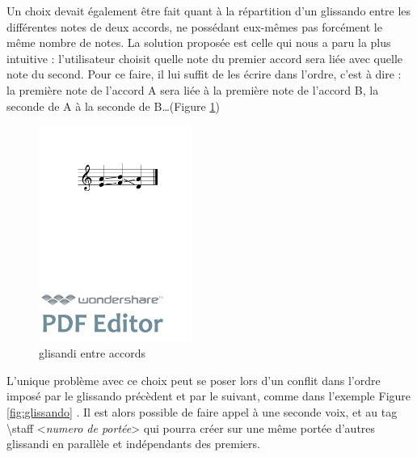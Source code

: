 \documentclass[a4paper,10pt,twocolumn]{article}
\newenvironment{code}
  {\fontfamily{pnc}\selectfont}{}
\begin{document}
Un choix devait également être fait quant à la répartition d'un glissando entre les différentes notes de deux accords, ne possédant eux-mêmes pas forcément le même nombre de notes. La solution proposée est celle qui nous a paru la plus intuitive : l'utilisateur choisit quelle note du premier accord sera liée avec quelle note du second. Pour ce faire, il lui suffit de les écrire dans l'ordre, c'est à dire : la première note de l'accord A sera liée à la première note de l'accord B, la seconde de A à la seconde de B\dots (Figure \ref{fig:glissandosimple})

\begin{figure}[h]
\begin{center}
\begin{code}
[\textbackslash{}glissando(\{e,a\} \{f,b\} \{a,d\})]
\end{code}

\includegraphics[width=5cm]{img/glissandosimple.pdf}
\caption{glisandi entre accords}
\label{fig:glissandosimple}
\end{center}
\end{figure}

L'unique problème avec ce choix peut se poser lors d'un conflit dans l'ordre imposé par le glissando précèdent et par le suivant, comme dans l'exemple Figure \ref{fig:glissando} . Il est alors possible de faire appel à une seconde voix, et au tag \textbackslash{}staff \textless{}\textit{numero de portée}\textgreater{} qui pourra créer sur une même portée d'autres glissandi en parallèle et indépendants des premiers.
\end{document}
